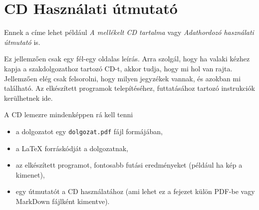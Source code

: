 \pagestyle{empty}

\section*{CD Használati útmutató}

Ennek a címe lehet például \textit{A mellékelt CD tartalma} vagy \textit{Adathordozó használati útmutató} is.

Ez jellemzően csak egy fél-egy oldalas leírás.
Arra szolgál, hogy ha valaki kézhez kapja a szakdolgozathoz tartozó CD-t, akkor tudja, hogy mi hol van rajta.
Jellemzően elég csak felsorolni, hogy milyen jegyzékek vannak, és azokban mi található.
Az elkészített programok telepítéséhez, futtatásához tartozó instrukciók kerülhetnek ide.

A CD lemezre mindenképpen rá kell tenni
\begin{itemize}
    \item a dolgozatot egy \texttt{dolgozat.pdf} fájl formájában,
    \item a LaTeX forráskódját a dolgozatnak,
    \item az elkészített programot, fontosabb futási eredményeket (például ha kép a kimenet),
    \item egy útmutatót a CD használatához (ami lehet ez a fejezet külön PDF-be vagy MarkDown fájlként kimentve).
\end{itemize}
